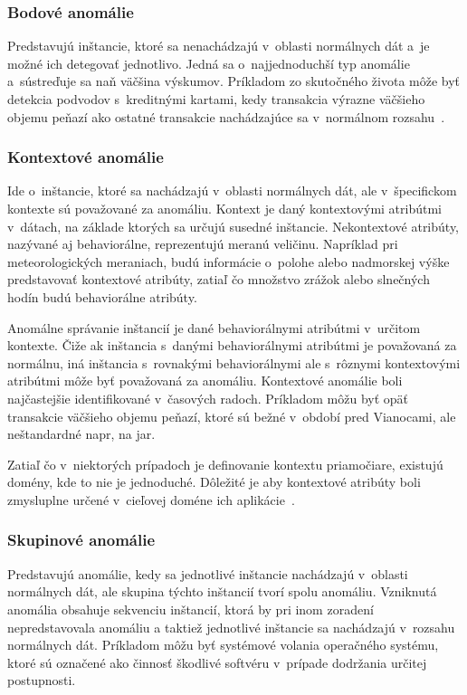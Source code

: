 \documentclass[a4paper,twoside,slovak,12pt]{article}
\begin{document}
\subsubsection{Bodové anomálie}
Predstavujú inštancie, ktoré sa nenachádzajú v~oblasti normálnych dát a~je
možné ich detegovať jednotlivo. Jedná sa o~najjednoduchší typ anomálie
a~sústreďuje sa naň väčšina výskumov. Príkladom zo skutočného života môže byť
detekcia podvodov s~kreditnými kartami, kedy transakcia výrazne väčšieho objemu
peňazí ako ostatné transakcie nachádzajúce sa v~normálnom rozsahu~\cite{Chandola2009}.

\subsubsection{Kontextové anomálie}
Ide o~inštancie, ktoré sa nachádzajú v~oblasti normálnych dát, ale v~špecifickom
kontexte sú považované za anomáliu. Kontext je daný kontextovými atribútmi
v~dátach, na základe ktorých sa určujú susedné inštancie. Nekontextové atribúty,
nazývané aj behaviorálne, reprezentujú meranú veličinu. Napríklad pri
meteorologických meraniach, budú informácie o~polohe alebo nadmorskej výške
predstavovať kontextové atribúty, zatiaľ čo množstvo zrážok alebo slnečných hodín
budú behaviorálne atribúty.

Anomálne správanie inštancií je dané behaviorálnymi atribútmi v~určitom kontexte.
Čiže ak inštancia s~danými behaviorálnymi atribútmi je považovaná za normálnu,
iná inštancia s~rovnakými behaviorálnymi ale s~rôznymi kontextovými atribútmi
môže byť považovaná za anomáliu. Kontextové anomálie boli najčastejšie
identifikované v~časových radoch. Príkladom môžu byť opäť transakcie väčšieho
objemu peňazí, ktoré sú bežné v~období pred Vianocami, ale neštandardné napr, na jar.

Zatiaľ čo v~niektorých prípadoch je definovanie kontextu priamočiare, existujú
domény, kde to nie je jednoduché. Dôležité je aby kontextové atribúty boli
zmysluplne určené v~cieľovej doméne ich aplikácie~\cite{Chandola2009}.

\subsubsection{Skupinové anomálie}
Predstavujú anomálie, kedy sa jednotlivé inštancie nachádzajú v~oblasti
normálnych dát, ale skupina týchto inštancií tvorí spolu anomáliu. Vzniknutá
anomália obsahuje sekvenciu inštancií, ktorá by pri inom zoradení nepredstavovala
anomáliu a taktiež jednotlivé inštancie sa nachádzajú v~rozsahu normálnych dát.
Príkladom môžu byť systémové volania operačného systému, ktoré sú označené ako
činnosť škodlivé softvéru v~prípade dodržania určitej postupnosti.
\end{document}
